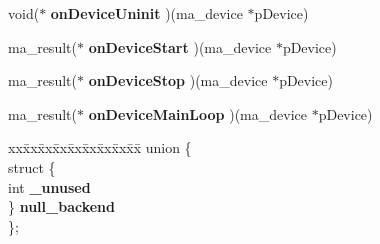 \begin{DoxyCompactItemize}
\item 
\mbox{\label{structma__context_a0a2fa822bab9b96821a9fba479d4e8e0}} 
void($\ast$ {\bfseries on\+Device\+Uninit} )(ma\+\_\+device $\ast$p\+Device)
\item 
\mbox{\label{structma__context_a78c81bc4c94f6cb48a1b39aa4ebe1099}} 
ma\+\_\+result($\ast$ {\bfseries on\+Device\+Start} )(ma\+\_\+device $\ast$p\+Device)
\item 
\mbox{\label{structma__context_a09f796458561e4409bacc62ad95456f2}} 
ma\+\_\+result($\ast$ {\bfseries on\+Device\+Stop} )(ma\+\_\+device $\ast$p\+Device)
\item 
\mbox{\label{structma__context_a5affd3f4739f819dea262d6b60d5e508}} 
ma\+\_\+result($\ast$ {\bfseries on\+Device\+Main\+Loop} )(ma\+\_\+device $\ast$p\+Device)
\item 
\mbox{\label{structma__context_a380aeca70b146225b70bc84c0424e181}} 
\begin{tabbing}
xx\=xx\=xx\=xx\=xx\=xx\=xx\=xx\=xx\=\kill
union \{\\
\>struct \{\\
\>\>int {\bfseries \_unused}\\
\>\} {\bfseries null\_backend}\\
\}; \\


\end{tabbing}
\end{DoxyCompactItemize}
